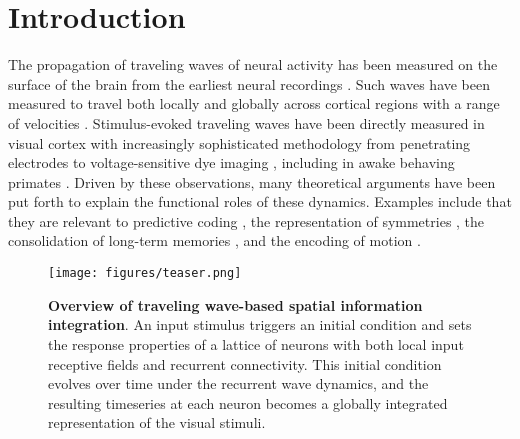 
\section{Introduction}

The propagation of traveling waves of neural activity has been measured on the surface of the brain from the earliest neural recordings \citep{adrian1934, goldman1949, lilly1949method, mickle1953}. Such waves have been measured to travel both locally and globally across cortical regions with a range of velocities \citep{auditory_waves, Muller2016, Zhang2018}. Stimulus-evoked traveling waves have been directly measured in visual cortex \citep{cowey1964} with increasingly sophisticated methodology from penetrating electrodes \citep{EBERSOLE1981160} to voltage-sensitive dye imaging \citep{Muller2014}, including in awake behaving primates \citep{Davis2020}.  Driven by these observations, many theoretical arguments have been put forth to explain the functional roles of these dynamics. Examples include that they are relevant to predictive coding \citep{pc_waves}, the representation of symmetries \citep{keller2024spacetimeperspectivedynamicalcomputation}, the consolidation of long-term memories \citep{Muller2018}, and the encoding of motion \citep{motionwaves}. 

\begin{figure}[t]
    \centering
    \texttt{[image: figures/teaser.png]} 
    \caption{\textbf{Overview of traveling wave-based spatial information integration}. An input stimulus triggers an initial condition and sets the response properties of a lattice of neurons with both local input receptive fields and recurrent connectivity. This initial condition evolves over time under the recurrent wave dynamics, and the resulting timeseries at each neuron becomes a globally integrated representation of the visual stimuli.}
    \label{fig:overview}    
    \vspace{-3mm}
\end{figure}


